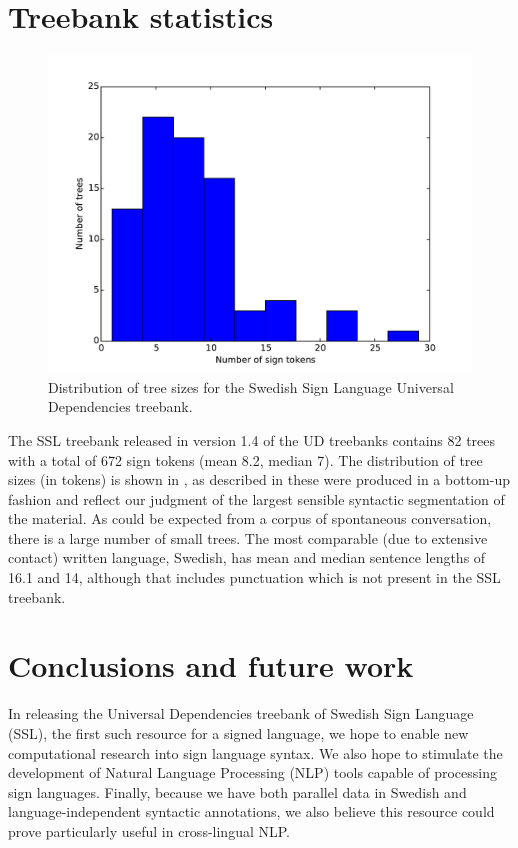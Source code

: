 \documentclass[11pt]{article}
\begin{document}
\section{Treebank statistics}

\begin{figure}[tb]
	\centering
	\includegraphics[width=\linewidth]{treesizes.pdf}
    \caption{Distribution of tree sizes for the Swedish Sign
        Language Universal Dependencies treebank.}
	\label{fig:treesizes}
\end{figure}

The SSL treebank released in version 1.4 of the UD treebanks
contains 82 trees with a total of 672 sign tokens (mean 8.2, median 7).
The distribution of tree sizes (in tokens) is shown in ,
as described in  these were produced in a bottom-up
fashion and reflect our judgment of the largest sensible syntactic
segmentation of the material.
As could be expected from a corpus of spontaneous conversation, there is a
large number of small trees. The most comparable (due to extensive contact)
written language, Swedish, has mean and median sentence lengths of 16.1 and
14, although that includes punctuation which is not present in the SSL
treebank.


\section{Conclusions and future work}

In releasing the Universal Dependencies treebank of Swedish Sign Language
(SSL), the first such resource for a signed language,
we hope to enable new computational research into sign language syntax.
We also hope to stimulate the development of Natural
Language Processing (NLP) tools capable of processing sign languages.
Finally, because we have both parallel data in Swedish and language-independent
syntactic annotations, we also believe this resource could prove particularly
useful in cross-lingual NLP.


%



\end{document}
